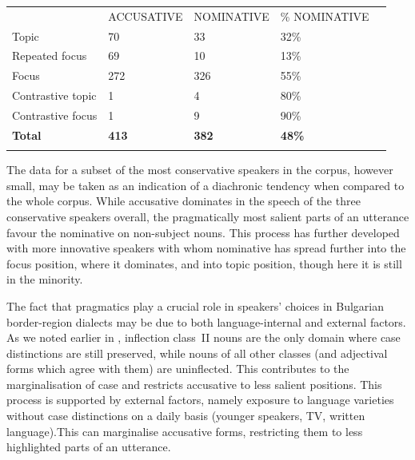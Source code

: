\documentclass[output=paper]{langscibook}
\begin{document}
\begin{tabularx}{\textwidth}{XXXXX}

\lsptoprule
~ & ACCUSATIVE & NOMINATIVE & \% NOMINATIVE & \\
Topic & 70 & 33 & 32\% & \\
Repeated focus & 69 & 10 & 13\% & \\
Focus & 272 & 326 & 55\% & \\
Contrastive topic & 1 & 4 & 80\% & \\
Contrastive focus & 1 & 9 & 90\% & \\
\textbf{Total}  & \textbf{413} & \textbf{382} & \textbf{48\%} & \\
\lspbottomrule
\end{tabularx}
\begin{table}
\caption{Distribution of nominative and accusative forms with non-subject nouns for the three most innovative individual dialects. Raw numbers and \% of nominative}
\label{tab:key:6}
\end{table}

The data for a subset of the most conservative speakers in the corpus, however small, may be taken as an indication of a diachronic tendency when compared to the whole corpus. While accusative dominates in the speech of the three conservative speakers overall, the pragmatically most salient parts of an utterance favour the nominative on non-subject nouns. This process has further developed with more innovative speakers with whom nominative has spread further into the focus position, where it dominates, and into topic position, though here it is still in the minority. 

The fact that pragmatics play a crucial role in speakers’ choices in Bulgarian border-region dialects may be due to both language-internal and external factors. As we noted earlier in , inflection class~II nouns are the only domain where case distinctions are still preserved, while nouns of all other classes (and adjectival forms which agree with them) are uninflected. This contributes to the marginalisation of case and restricts accusative to less salient positions. This process is supported by external factors, namely exposure to language varieties without case distinctions on a daily basis (younger speakers, TV, written language).This can marginalise accusative forms, restricting them to less highlighted parts of an utterance.  
\end{document}
